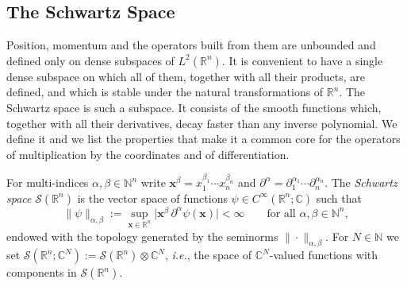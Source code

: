 
\subsection*{The Schwartz Space}

Position, momentum and the operators built from them are unbounded and defined only on dense subspaces of $L^2(\mathbb{R}^n)$. It is convenient to have a single dense subspace on which all of them, together with all their products, are defined, and which is stable under the natural transformations of $\mathbb{R}^n$. The Schwartz space is such a subspace. It consists of the smooth functions which, together with all their derivatives, decay faster than any inverse polynomial. We define it and we list the properties that make it a common core for the operators of multiplication by the coordinates and of differentiation.

\begin{definition}\label{def:schwartz}
	For multi-indices $\alpha,\beta\in\mathbb{N}^n$ write $\mathbf{x}^\beta=x_1^{\beta_1}\cdots x_n^{\beta_n}$ and $\partial^\alpha=\partial_1^{\alpha_1}\cdots\partial_n^{\alpha_n}$. The \emph{Schwartz space} $\mathcal{S}(\mathbb{R}^n)$ is the vector space of functions $\psi\in C^\infty(\mathbb{R}^n;\mathbb{C})$ such that
	\begin{equation*}
		\|\psi\|_{\alpha,\beta}:=\sup_{\mathbf{x}\in\mathbb{R}^n}\big|\mathbf{x}^\beta\,\partial^\alpha\psi(\mathbf{x})\big|<\infty \qquad \text{for all } \alpha,\beta\in\mathbb{N}^n,
	\end{equation*}
	endowed with the topology generated by the seminorms $\|\cdot\|_{\alpha,\beta}$. For $N\in\mathbb{N}$ we set $\mathcal{S}(\mathbb{R}^n;\mathbb{C}^N):=\mathcal{S}(\mathbb{R}^n)\otimes\mathbb{C}^N$, \textit{i.e.}, the space of $\mathbb{C}^N$-valued functions with components in $\mathcal{S}(\mathbb{R}^n)$.
\end{definition}

